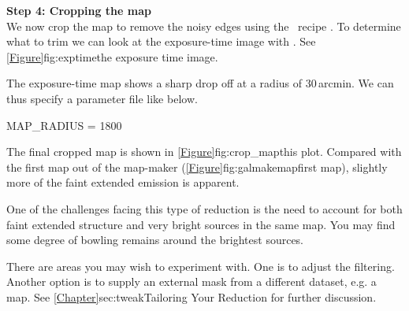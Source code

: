\documentclass[11pt,oneside,chapters]{starlink}
\begin{document}
\textbf{Step 4: Cropping the map}
\vspace{0.2cm}\\
We now crop the map to remove the noisy edges using the \picard\ recipe
. To determine what to trim we can look
at the exposure-time image with \gaia.  See
\cref{Figure}{fig:exptime}{the exposure time image}.


The exposure-time map shows a sharp drop off at a radius of 30\,arcmin.
We can thus specify a parameter file like below.
\begin{center}
\begin{terminalv}
MAP_RADIUS = 1800
\end{terminalv}
\end{center}

\begin{terminalv}
\end{terminalv}
The final cropped map is shown in \cref{Figure}{fig:crop_map}{this plot}.
Compared with the first map out of the map-maker
(\cref{Figure}{fig:galmakemap}{first map}),
slightly more of the faint extended emission is apparent.

One of the challenges facing this type of reduction is the need to
account for both faint extended structure and very bright sources in
the same map. You may find some degree of bowling remains around the
brightest sources.

There are areas you may wish to experiment with. One is to adjust the
filtering. Another option is to supply an external mask from
a different dataset, e.g. a
 map.
See \cref{Chapter}{sec:tweak}{Tailoring Your Reduction} for further
discussion.



\clearpage
\end{document}
